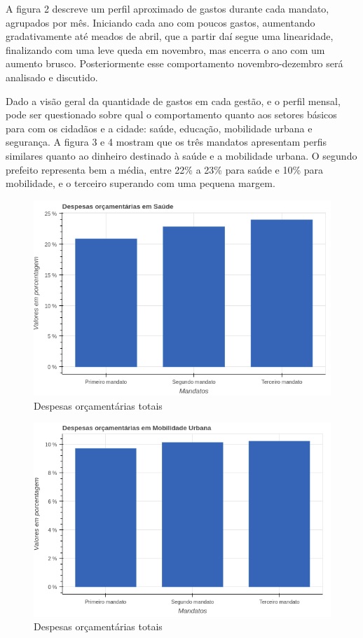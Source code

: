 \documentclass[authoryear]{elsarticle}
\begin{document}
A figura 2 descreve um perfil aproximado de gastos durante cada mandato, agrupados por mês. Iniciando cada ano com poucos gastos, aumentando gradativamente até meados de abril, que a partir daí segue uma linearidade, finalizando com uma leve queda em novembro, mas encerra o ano com um aumento brusco. Posteriormente esse comportamento novembro-dezembro será analisado e discutido.

Dado a visão geral da quantidade de gastos em cada gestão, e o perfil mensal, pode ser questionado sobre qual o comportamento quanto aos setores básicos para com os cidadãos e a cidade: saúde, educação, mobilidade urbana e segurança. A figura 3 e 4 mostram que os três mandatos apresentam perfis similares quanto ao dinheiro destinado à saúde e a mobilidade urbana. O segundo prefeito representa bem a média, entre 22\% a 23\% para saúde e 10\% para mobilidade, e o terceiro superando com uma pequena margem.

\graphicspath{{figuras/}}
\begin{figure}[H]
\centering
\includegraphics[scale=0.5]{figura_7.png}
\caption{Despesas orçamentárias totais}
\label{Rotulo}
\end{figure}


\graphicspath{{figuras/}}
\begin{figure}[H]
\centering
\includegraphics[scale=0.5]{figura_9.png}
\caption{Despesas orçamentárias totais}
\label{Rotulo}
\end{figure}
\end{document}
